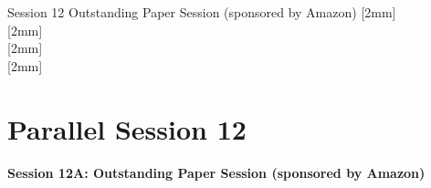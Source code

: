 \clearpage
{}
\begin{ThreeSessionOverview}{Session 12}{\daydateyear}
  {Outstanding Paper Session (sponsored by Amazon)}
  [2mm]
  \\
  \hline
  [2mm]
  \\
  \hline
  [2mm]
  \\
  \hline
  [2mm]
  \\
\end{ThreeSessionOverview}

\newpage
\section*{Parallel Session 12}
{\bfseries\large Session 12A: Outstanding Paper Session (sponsored by Amazon)}\\
\TrackALoc\hfill{}
\clearpage


